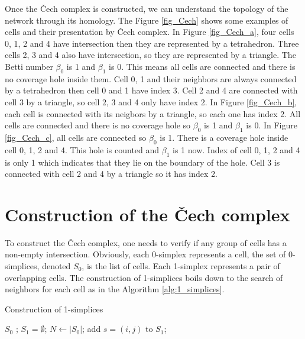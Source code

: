 \documentclass[conference]{IEEEtran}
\begin{document}
Once the \v{C}ech complex is constructed, we can understand the topology of the network through its homology. The Figure \ref{fig_Cech} shows some examples of cells and their presentation by \v{C}ech complex. In Figure \ref{fig_Cech_a}, four cells 0, 1, 2  and 4 have intersection then they are represented by a tetrahedron. Three cells 2, 3 and 4 also have intersection, so they are represented by a triangle. The Betti number $\beta_0$ is 1 and $\beta_1$ is 0. This means all cells are connected and there is no coverage hole inside them. Cell 0, 1 and their neighbors are always connected by a tetrahedron then cell 0 and 1 have index 3. Cell 2 and 4 are connected with cell 3 by a triangle, so cell 2, 3 and 4 only have index 2. In Figure \ref{fig_Cech_b}, each cell is connected with its neigbors by a triangle, so each one has index 2. All cells are connected and there is no coverage hole so $\beta_0$ is 1 and $\beta_1$ is 0. In Figure \ref{fig_Cech_c}, all cells are connected so $\beta_0$ is 1. There is a coverage hole inside cell 0, 1, 2 and 4. This hole is counted and $\beta_1$ is 1 now. Index of cell 0, 1, 2 and 4 is only 1 which indicates that they lie on the boundary of the hole. Cell 3 is connected with cell 2 and 4 by a triangle so it has index 2.

\section{Construction of the \v{C}ech complex}
\label{sec:algorithm}

To construct the \v{C}ech complex, one needs to verify if any group of cells has a non-empty intersection. Obviously, each 0-simplex represents a cell, the set of 0-simplices, denoted $S_0$, is the list of cells. Each 1-simplex represents a pair of overlapping cells. The construction of 1-simplices boils down to
the search of neighbors for each cell as in the Algorithm \ref{alg:1_simplices}.\par

\begin{algorithm}[H]
\caption{Construction of 1-simplices}
\label{alg:1_simplices}
\begin{algorithmic}
\REQUIRE $S_0$ ;
	\STATE $S_1 = \emptyset$; 
	\STATE $N \gets |S_0|$;
				\STATE add $s = (i,j)$ to $S_1$;
			\ENDIF
		\ENDFOR
	\ENDFOR
\end{algorithmic}
\end{algorithm}
\end{document}
